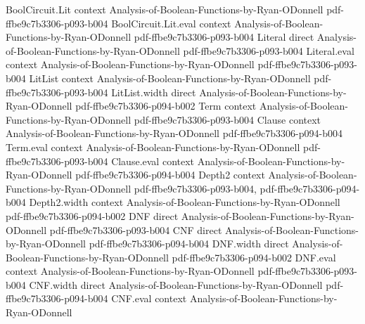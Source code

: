 \begin{theorem}
\leanok
{}
\proofstep
  {BoolCircuit.Lit}
  {context}
  {Analysis-of-Boolean-Functions-by-Ryan-ODonnell}
  {pdf-ffbe9c7b3306-p093-b004}
\proofstep
  {BoolCircuit.Lit.eval}
  {context}
  {Analysis-of-Boolean-Functions-by-Ryan-ODonnell}
  {pdf-ffbe9c7b3306-p093-b004}
\proofstep
  {Literal}
  {direct}
  {Analysis-of-Boolean-Functions-by-Ryan-ODonnell}
  {pdf-ffbe9c7b3306-p093-b004}
\proofstep
  {Literal.eval}
  {context}
  {Analysis-of-Boolean-Functions-by-Ryan-ODonnell}
  {pdf-ffbe9c7b3306-p093-b004}
\proofstep
  {LitList}
  {context}
  {Analysis-of-Boolean-Functions-by-Ryan-ODonnell}
  {pdf-ffbe9c7b3306-p093-b004}
\proofstep
  {LitList.width}
  {direct}
  {Analysis-of-Boolean-Functions-by-Ryan-ODonnell}
  {pdf-ffbe9c7b3306-p094-b002}
\proofstep
  {Term}
  {context}
  {Analysis-of-Boolean-Functions-by-Ryan-ODonnell}
  {pdf-ffbe9c7b3306-p093-b004}
\proofstep
  {Clause}
  {context}
  {Analysis-of-Boolean-Functions-by-Ryan-ODonnell}
  {pdf-ffbe9c7b3306-p094-b004}
\proofstep
  {Term.eval}
  {context}
  {Analysis-of-Boolean-Functions-by-Ryan-ODonnell}
  {pdf-ffbe9c7b3306-p093-b004}
\proofstep
  {Clause.eval}
  {context}
  {Analysis-of-Boolean-Functions-by-Ryan-ODonnell}
  {pdf-ffbe9c7b3306-p094-b004}
\proofstep
  {Depth2}
  {context}
  {Analysis-of-Boolean-Functions-by-Ryan-ODonnell}
  {pdf-ffbe9c7b3306-p093-b004,
    pdf-ffbe9c7b3306-p094-b004}
\proofstep
  {Depth2.width}
  {context}
  {Analysis-of-Boolean-Functions-by-Ryan-ODonnell}
  {pdf-ffbe9c7b3306-p094-b002}
\proofstep
  {DNF}
  {direct}
  {Analysis-of-Boolean-Functions-by-Ryan-ODonnell}
  {pdf-ffbe9c7b3306-p093-b004}
\proofstep
  {CNF}
  {direct}
  {Analysis-of-Boolean-Functions-by-Ryan-ODonnell}
  {pdf-ffbe9c7b3306-p094-b004}
\proofstep
  {DNF.width}
  {direct}
  {Analysis-of-Boolean-Functions-by-Ryan-ODonnell}
  {pdf-ffbe9c7b3306-p094-b002}
\proofstep
  {DNF.eval}
  {context}
  {Analysis-of-Boolean-Functions-by-Ryan-ODonnell}
  {pdf-ffbe9c7b3306-p093-b004}
\proofstep
  {CNF.width}
  {direct}
  {Analysis-of-Boolean-Functions-by-Ryan-ODonnell}
  {pdf-ffbe9c7b3306-p094-b004}
\proofstep
  {CNF.eval}
  {context}
  {Analysis-of-Boolean-Functions-by-Ryan-ODonnell}

\end{theorem}
